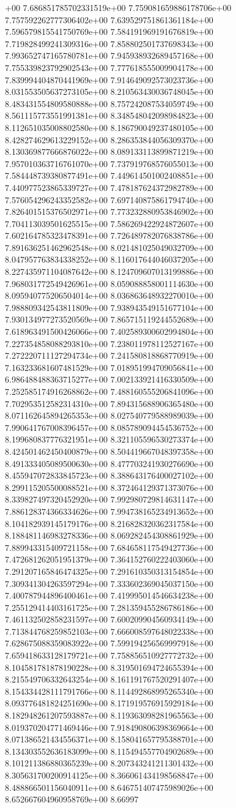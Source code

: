 +00	7.686851785702331519e+00	7.759081659886178706e+00	7.757592262777306402e+00	7.639529751861361184e+00	7.596579815541750769e+00	7.584191969191676819e+00	7.719828499241309316e+00	7.858802501737698343e+00	7.993652747165780781e+00	7.945938932689457168e+00	7.755339823792902543e+00	7.777618555009904178e+00	7.839994404870441969e+00	7.914649092573023736e+00	8.031553505637273105e+00	8.210563430036748045e+00	8.483431554809580888e+00	8.757242087534059749e+00	8.561115773551991381e+00	8.348548042098984823e+00	8.112651035008802580e+00	8.186790049237480105e+00	8.428274629613229152e+00	8.286353844056309370e+00	8.130369877666876022e+00	8.089133113899871219e+00	7.957010363716761070e+00	7.737919768576055013e+00	7.584448739380877491e+00	7.449614501002408851e+00	7.440977523865339727e+00	7.478187624372982789e+00	7.576054296243352582e+00	7.697140875861794740e+00	7.826401515376502971e+00	7.773232880953846902e+00	7.704113039501625515e+00	7.586269422924872607e+00	7.602164785323478391e+00	7.726489782076838786e+00	7.891636251462962548e+00	8.021481025049032709e+00	8.047957763834338252e+00	8.116017644046037205e+00	8.227435971104087642e+00	8.124709607013199886e+00	7.968031772549426961e+00	8.059088858001114630e+00	8.095940775206504014e+00	8.036863648932270010e+00	7.988809342543811809e+00	7.938943549151677104e+00	7.930134977273520569e+00	7.865715119244552689e+00	7.618963491500426066e+00	7.402589300602994804e+00	7.227354858088293810e+00	7.238011978112527167e+00	7.272220711127294734e+00	7.241580818868770919e+00	7.163233681607481529e+00	7.018951994709056841e+00	6.986488488363715277e+00	7.002133921416330509e+00	7.252585174916268862e+00	7.488160555206841096e+00	7.702953512582314310e+00	7.894315688906365480e+00	8.071162645894265353e+00	8.027540779588989039e+00	7.990641767008396457e+00	8.085789094454536752e+00	8.199680837776321951e+00	8.321105596530273374e+00	8.424501462450400879e+00	8.504419667048397358e+00	8.491333405089500630e+00	8.477703241930276690e+00	8.455947072833845723e+00	8.388643176400027102e+00	8.299115205500088521e+00	8.372464129371373076e+00	8.339827497320452920e+00	7.992980729814631147e+00	7.886128374366334626e+00	7.994738165234913652e+00	8.104182939145179176e+00	8.216828320362317584e+00	8.188481146983278336e+00	8.069282454308861929e+00	7.889943315409721158e+00	7.684658117549427736e+00	7.472681262051951379e+00	7.364152760222403060e+00	7.291207165846474325e+00	7.291610350313154854e+00	7.309341304263597294e+00	7.333602369045037150e+00	7.400787944896400461e+00	7.419995014546634238e+00	7.255129414403161725e+00	7.281359455286786186e+00	7.461132502858231597e+00	7.600209904560934149e+00	7.713844768259852103e+00	7.666008597648022338e+00	7.628675088359083922e+00	7.599194256569997918e+00	7.659418633128179721e+00	7.758856510927772732e+00	8.104581781878190228e+00	8.319501694724655394e+00	8.215549706332643254e+00	8.161191767520291407e+00	8.154334428111791766e+00	8.114492868995265340e+00	8.093776481824251690e+00	8.171919576915929184e+00	8.182948261207593887e+00	8.119363098281965563e+00	8.019370204771469446e+00	7.918490806398369664e+00	8.071386521434556371e+00	8.158041657795388701e+00	8.134303552636183099e+00	8.115494557704902689e+00	8.101211386880365239e+00	8.207343241211301432e+00	8.305631700200914125e+00	8.366061434198568847e+00	8.488866501156040911e+00	8.646751407475989026e+00	8.652667604960958769e+00	8.66997